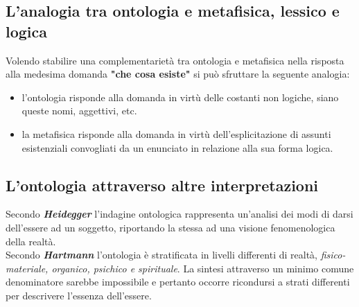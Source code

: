 \documentclass[a4paper,12pt]{article}
\begin{document}
\subsection{L'analogia tra ontologia e metafisica, lessico e logica} %
Volendo stabilire una complementarietà tra ontologia e metafisica nella risposta alla medesima domanda
\textbf{"che cosa esiste"} si può sfruttare la seguente analogia:
\begin{itemize}
    \item l'ontologia risponde alla domanda in virtù delle costanti non logiche, siano queste nomi, aggettivi, etc.
    \item la metafisica risponde alla domanda in virtù dell'esplicitazione di assunti esistenziali convogliati
    da un enunciato in relazione alla sua forma logica.
\end{itemize}

\subsection{L'ontologia attraverso altre interpretazioni} %
Secondo \textbf{\textit{Heidegger}} l'indagine ontologica rappresenta un'analisi dei modi di darsi dell'essere
ad un soggetto, riportando la stessa ad una visione fenomenologica della realtà.
\\ Secondo \textbf{\textit{Hartmann}} l'ontologia è stratificata in livelli differenti di realtà, 
\textit{fisico-materiale, organico, psichico e spirituale}. La sintesi attraverso un minimo comune denominatore
sarebbe impossibile e pertanto occorre ricondursi a strati differenti per descrivere l'essenza dell'essere. 
\end{document}
